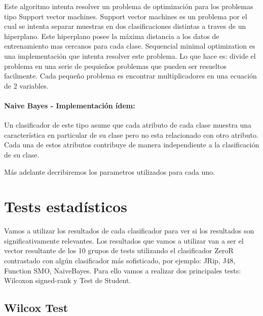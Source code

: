 \documentclass[11pt,a4paper,twoside]{tesis}
\begin{document}

Este algoritmo intenta resolver un problema de optimización para los problemas tipo Support vector machines. Support vector machines es un problema por el cual se intenta separar muestras en dos clasificaciones distintas a traves de un hiperplano. Este hiperplano posee la máxima distancia a los datos de entrenamiento mas cercanos para cada clase. Sequencial minimal optimization es una implementación que intenta resolver este problema. Lo que hace es: divide el problema en una serie de pequieños problemas que pueden ser resueltos facilmente. Cada pequeño problema es encontrar multiplicadores en una ecuación de 2 variables. 

\paragraph{Naive Bayes - Implementación ídem:}


Un clasificador de este tipo asume que cada atributo de cada clase muestra una característica en particular de su clase pero no esta relacionado con otro atributo. Cada una de estos atributos contribuye de manera independiente a la clasificación de su clase. 

Más adelante decribiremos los parametros utilizados para cada uno.

\section{Tests estadísticos}

Vamos a utilizar los resultados de cada clasificador para ver si los resultados son significativamente relevantes. Los resultados que vamos a utilizar van a ser el vector resultante de los 10 grupos de tests utilizando el clasificador ZeroR contrastado con algún clasificador más sofisticado, por ejemplo: JRip, J48, Function SMO, NaiveBayes.
Para ello vamos a realizar dos principales tests: Wilcoxon signed-rank y Test de Student. 

\subsection{Wilcox Test}
\end{document}
